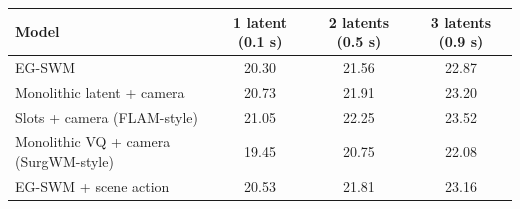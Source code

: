 \begin{tabular}{lccc}
\toprule
Model & 1 latent (0.1 s) & 2 latents (0.5 s) & 3 latents (0.9 s) \\
\midrule
EG-SWM & 20.30 & 21.56 & 22.87 \\
Monolithic latent + camera & 20.73 & 21.91 & 23.20 \\
Slots + camera (FLAM-style) & 21.05 & 22.25 & 23.52 \\
Monolithic VQ + camera (SurgWM-style) & 19.45 & 20.75 & 22.08 \\
EG-SWM + scene action & 20.53 & 21.81 & 23.16 \\
\bottomrule
\end{tabular}
